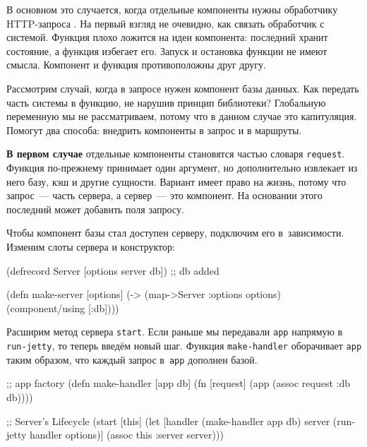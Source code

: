 В основном это случается, когда отдельные компоненты нужны обработчику
HTTP-запроса . На первый взгляд не очевидно, как связать
обработчик с системой. Функция плохо ложится на идеи компонента: последний
хранит состояние, а функция избегает его. Запуск и остановка функции не имеют
смысла. Компонент и функция противоположны друг другу.

Рассмотрим случай, когда в запросе нужен компонент базы данных. Как передать
часть системы в функцию, не нарушив принцип библиотеки? Глобальную переменную мы
не рассматриваем, потому что в данном случае это капитуляция. Помогут два
способа: внедрить компоненты в запрос и в маршруты.

\textbf{В первом случае} отдельные компоненты становятся частью словаря
\verb|request|. Функция по-прежнему принимает один аргумент, но дополнительно
извлекает из него базу, кэш и другие сущности. Вариант имеет право на жизнь,
потому что запрос~--- часть сервера, а сервер~--- это компонент. На основании
этого последний может добавить поля запросу.

Чтобы компонент базы стал доступен серверу, подключим его в~зависимости. Изменим
слоты сервера и конструктор:

\begin{english}
  \begin{clojure}
(defrecord Server
  [options server db]) ;; db added

(defn make-server
  [options]
  (-> (map->Server {:options options})
      (component/using [:db])))
  \end{clojure}
\end{english}

Расширим метод сервера \verb|start|. Если раньше мы передавали \verb|app|
напрямую в \verb|run-jetty|, то теперь введём новый шаг. Функция
\texttt{make\--hand\-ler} оборачивает \verb|app| таким образом, что каждый запрос
в~\verb|app| дополнен базой.

\ifnarrow

\begin{english}
  \begin{clojure}
;; app factory
(defn make-handler [app db]
  (fn [request]
    (app (assoc request :db db))))

;; Server's Lifecycle
(start [this]
  (let [handler (make-handler app db)
        server (run-jetty handler
                 options)]
    (assoc this :server server)))
  \end{clojure}
\end{english}

